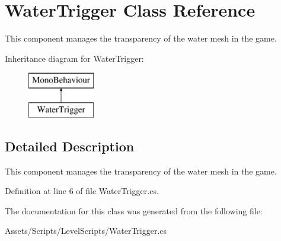 \hypertarget{class_water_trigger}{\section{Water\+Trigger Class Reference}
\label{class_water_trigger}
}


This component manages the transparency of the water mesh in the game.  


Inheritance diagram for Water\+Trigger\+:\begin{figure}[H]
\begin{center}
\leavevmode
\includegraphics[height=2.000000cm]{class_water_trigger}
\end{center}
\end{figure}


\subsection{Detailed Description}
This component manages the transparency of the water mesh in the game. 



Definition at line 6 of file Water\+Trigger.\+cs.



The documentation for this class was generated from the following file\+:\begin{DoxyCompactItemize}
\item 
Assets/\+Scripts/\+Level\+Scripts/Water\+Trigger.\+cs\end{DoxyCompactItemize}
